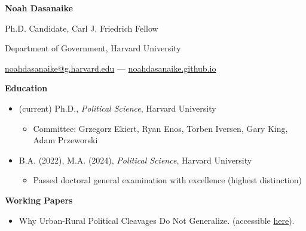 \documentclass[12pt]{article}
\begin{document}
\begin{footnotesize} 

\begin{center}

{\bf {\large Noah Dasanaike}}

\vspace{3mm} 

Ph.D. Candidate, Carl J. Friedrich Fellow

Department of Government, Harvard University

\href{mailto:noahdasanaike@g.harvard.edu}{noahdasanaike@g.harvard.edu} — \href{https://noahdasanaike.github.io}{noahdasanaike.github.io}

\end{center}

\vspace{5mm} 


{\bf {\normalsize Education}}
\vspace{3mm} 

\begin{itemize}[noitemsep,nolistsep]
\item (current) Ph.D., \textit{Political Science}, Harvard University
\vspace{-1.5mm}
\begin{itemize}
\item Committee: Grzegorz Ekiert, Ryan Enos, Torben Iversen, Gary King, Adam Przeworski
\end{itemize}
\item B.A. (2022), M.A. (2024), \textit{Political Science}, Harvard University
\vspace{-1.5mm}
\begin{itemize}
\item Passed doctoral general examination with excellence (highest distinction)
\end{itemize}
\end{itemize}

\vspace{3.5mm} 







{\bf {\normalsize Working Papers}}

\vspace{3mm} 

\begin{itemize}[noitemsep,nolistsep]

\item Why Urban-Rural Political Cleavages Do Not Generalize. (accessible \href{https://www.dropbox.com/scl/fi/f5ol59b0n9exxebt3un5v/Dasanaike_Urban_Rural_2025.pdf?rlkey=m1xcfrvl7ey82k7d5kaakkci3&e=1&st=mjmzzuki&dl=0}{here}).


\end{itemize}
\end{footnotesize}
\end{document}
